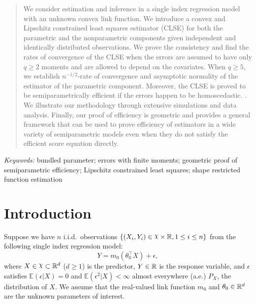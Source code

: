 \begin{abstract}
We consider estimation and inference in a single index regression model with an unknown convex link function.  We introduce a convex and Lipschitz constrained least squares estimator (CLSE) for both  the parametric and the nonparametric components given independent and identically distributed observations. We prove the consistency and find the rates of convergence of the CLSE when the errors are assumed to have only $q \ge 2$ moments and are allowed to depend on the covariates. When $q\ge 5$, we establish $n^{-1/2}$-rate of convergence and asymptotic normality of  the estimator of the parametric component.  Moreover,  the CLSE is proved to be semiparametrically efficient if the  errors happen to be homoscedastic. \fi{}\fi. We illustrate our methodology through extensive simulations and data analysis. Finally,  our proof of efficiency is geometric and provides a general framework that can be used to prove efficiency of estimators in a wide variety of semiparametric models even when they do not satisfy the efficient score equation directly. 
 \end{abstract}
\noindent%
{\it Keywords:} {bundled parameter}; {errors with finite moments}; {geometric proof of semiparametric efficiency}; {Lipschitz constrained least squares};  {shape restricted function estimation}
\section{Introduction}\label{sec:intro}
Suppose  we have $n$ i.i.d.~observations $\{(X_i,Y_i)\in   \rchi\times \R, 1\le i\le n\}$
from the following single index regression model:
\begin{equation}\label{eq:simsl}
Y = m_0(\theta_0^{\top}X) + \epsilon,
\end{equation}
where $X \in   \rchi \subset \R^d$ ($d \ge 1$) is the predictor,  $Y \in \mathbb{R}$ is the response variable, and $\epsilon$ satisfies $\mathbb{E}(\epsilon|X) = 0$ and $\mathbb{E}(\epsilon^2|X) < \infty$ almost everywhere (a.e.) $P_X$, the distribution of $X$. We assume that the real-valued link function  $m_0$ and $\theta_0 \in \mathbb{R}^d$ are the unknown parameters of interest. 

